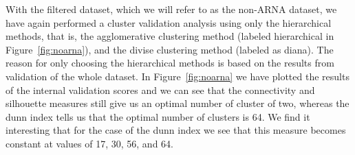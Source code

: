 With  the filtered dataset,  which we  will refer  to as  the non-ARNA
dataset, we  have again performed a cluster  validation analysis using
only the  hierarchical methods, that is,  the agglomerative clustering
method  (labeled  hierarchical  in Figure~\ref{fig:noarna}),  and  the
divise  clustering method  (labeled as  diana).  The  reason  for only
choosing the  hierarchical methods  is based on  the results  from
validation of  the whole dataset.  In  Figure~\ref{fig:noarna} we have
plotted the results  of the internal validation scores  and we can see
that the connectivity and silhouette measures still give us an optimal
number of  cluster of two,  whereas the dunn  index tells us  that the
optimal number of clusters is 64.  We find it interesting that for the
case of  the dunn index we  see that this measure  becomes constant at
values of 17, 30, 56, and 64.









